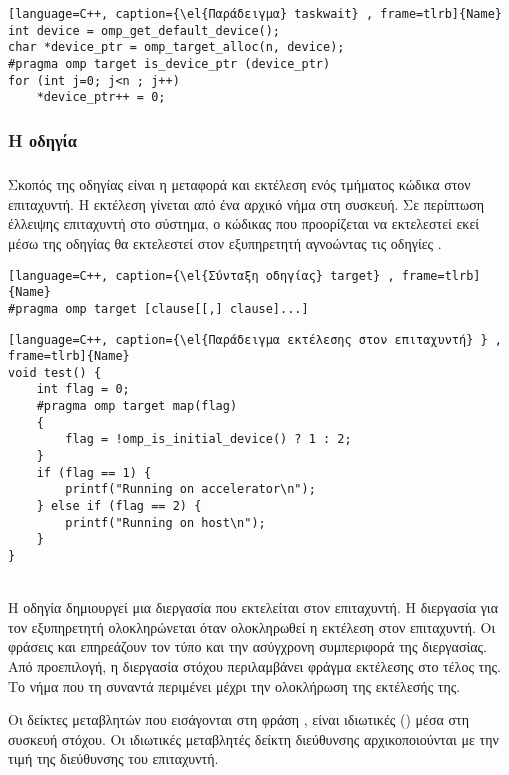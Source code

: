 \begin{lstlisting}[language=C++, caption={\el{Παράδειγμα} taskwait} , frame=tlrb]{Name}
int device = omp_get_default_device();
char *device_ptr = omp_target_alloc(n, device);
#pragma omp target is_device_ptr (device_ptr)
for (int j=0; j<n ; j++)
	*device_ptr++ = 0;
\end{lstlisting}
\clearpage


\subsubsection{Η οδηγία }
\subparagraph{}
Σκοπός της οδηγίας \emph{} είναι η μεταφορά και εκτέλεση ενός τμήματος κώδικα στον επιταχυντή. Η εκτέλεση γίνεται από ένα αρχικό νήμα στη συσκευή. Σε περίπτωση έλλειψης επιταχυντή στο σύστημα, ο κώδικας που προορίζεται να εκτελεστεί εκεί μέσω της οδηγίας \emph{} θα εκτελεστεί στον εξυπηρετητή αγνοώντας τις οδηγίες \emph{}.

\begin{lstlisting}[language=C++, caption={\el{Σύνταξη οδηγίας} target} , frame=tlrb]{Name}
#pragma omp target [clause[[,] clause]...]
\end{lstlisting}

\begin{lstlisting}[language=C++, caption={\el{Παράδειγμα εκτέλεσης στον επιταχυντή} } , frame=tlrb]{Name}
void test() {
	int flag = 0;
	#pragma omp target map(flag)
	{
		flag = !omp_is_initial_device() ? 1 : 2;
	}
	if (flag == 1) {
		printf("Running on accelerator\n");
	} else if (flag == 2) {
		printf("Running on host\n");
	}
}
\end{lstlisting}
\ \\
Η οδηγία \emph{} δημιουργεί μια διεργασία που εκτελείται στον επιταχυντή. Η διεργασία για τον εξυπηρετητή ολοκληρώνεται όταν ολοκληρωθεί η εκτέλεση στον επιταχυντή. Οι φράσεις \emph{} και \emph{} επηρεάζουν τον τύπο και την ασύγχρονη συμπεριφορά της διεργασίας. Από προεπιλογή, η διεργασία στόχου περιλαμβάνει φράγμα εκτέλεσης στο τέλος της. Το νήμα που τη συναντά περιμένει μέχρι την ολοκλήρωση της εκτέλεσής της.

Οι δείκτες μεταβλητών που εισάγονται στη φράση \emph{}, είναι ιδιωτικές (\emph{}) μέσα στη συσκευή στόχου. Οι ιδιωτικές μεταβλητές δείκτη διεύθυνσης αρχικοποιούνται με την τιμή της διεύθυνσης του επιταχυντή.

